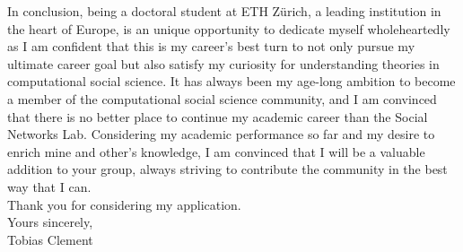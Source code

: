 In conclusion, being a doctoral student at ETH Zürich, a leading institution in the heart of Europe, is an unique opportunity to dedicate myself wholeheartedly as I am confident that this is my career's best turn to not only pursue my ultimate career goal but also satisfy my curiosity for understanding theories in computational social science. 
It has always been my age-long ambition to become a member of the computational social science community, and I am convinced that there is no better place to continue my academic career than the Social Networks Lab. 
Considering my academic performance so far and my desire to enrich mine and other's knowledge, I am convinced that I will be a valuable addition to your group, always striving to contribute the community in the best way that I can.\\

Thank you for considering my application.\\

Yours sincerely,\\
Tobias Clement\\\\\
